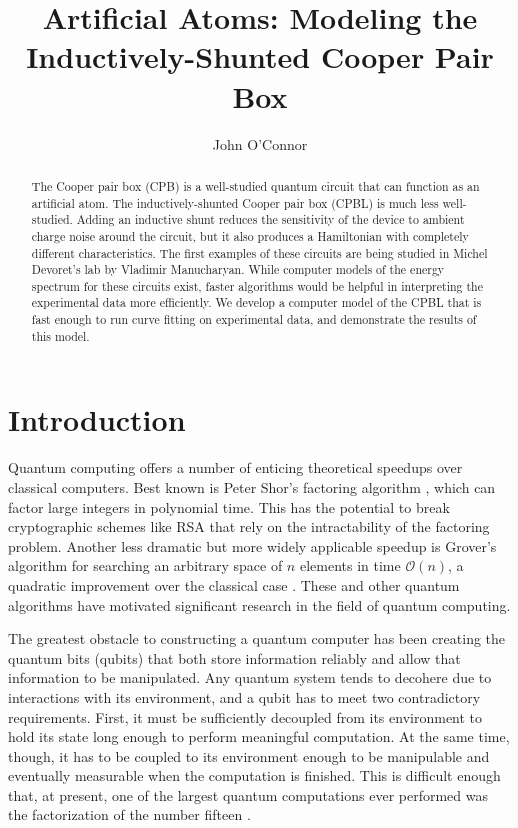 \documentclass[twocolumn]{revtex4}
\begin{document}
\title{Artificial Atoms: Modeling the Inductively-Shunted Cooper Pair
  Box}
\author{John O'Connor}

\begin{abstract}
  The Cooper pair box (CPB) is a well-studied quantum circuit that can
  function as an artificial atom. The inductively-shunted Cooper pair
  box (CPBL) is much less well-studied. Adding an inductive shunt
  reduces the sensitivity of the device to ambient charge noise around
  the circuit, but it also produces a Hamiltonian with completely
  different characteristics. The first examples of these circuits are
  being studied in Michel Devoret's lab by Vladimir Manucharyan.
  While computer models of the energy spectrum for these circuits
  exist, faster algorithms would be helpful in interpreting the
  experimental data more efficiently. We develop a computer model of
  the CPBL that is fast enough to run curve fitting on experimental
  data, and demonstrate the results of this model.
\end{abstract}

\maketitle

\section{Introduction}

Quantum computing offers a number of enticing theoretical speedups
over classical computers. Best known is Peter Shor's factoring
algorithm \cite{Shor}, which can factor large integers in polynomial
time. This has the potential to break cryptographic schemes like RSA
that rely on the intractability of the factoring problem. Another less
dramatic but more widely applicable speedup is Grover's algorithm for
searching an arbitrary space of $n$ elements in time $\mathcal{O}(n)$,
a quadratic improvement over the classical case \cite{Grover}. These
and other quantum algorithms have motivated significant research in
the field of quantum computing.

The greatest obstacle to constructing a quantum computer has been
creating the quantum bits (qubits) that both store information
reliably and allow that information to be manipulated. Any quantum
system tends to decohere due to interactions with its environment, and
a qubit has to meet two contradictory requirements. First, it must be
sufficiently decoupled from its environment to hold its state long
enough to perform meaningful computation. At the same time, though, it
has to be coupled to its environment enough to be manipulable and
eventually measurable when the computation is finished. This is
difficult enough that, at present, one of the largest quantum
computations ever performed was the factorization of the number
fifteen \cite{Vandersypen}.
\end{document}
